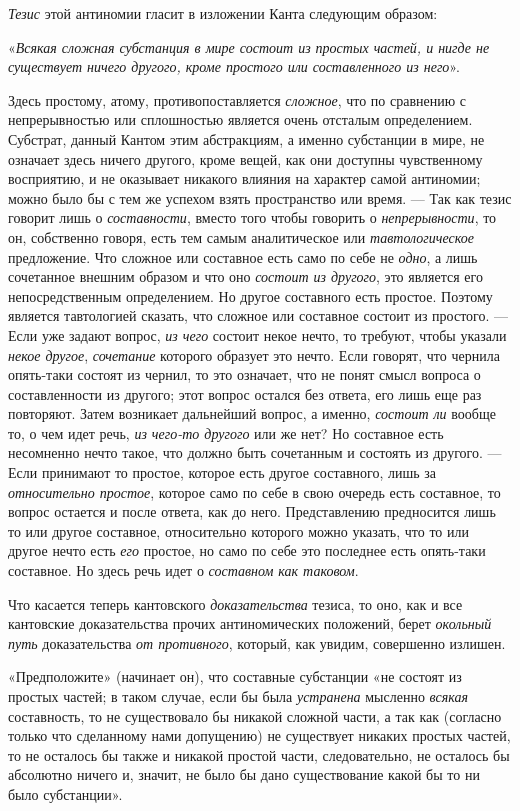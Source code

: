 {\em Тезис} этой антиномии гласит в изложении Канта
следующим образом:

«{\em Всякая сложная субстанция в мире состоит из
простых частей, и нигде не существует ничего другого, кроме простого или
составленного из него}».

Здесь простому, атому, противопоставляется
{\em сложное}, что по сравнению с непрерывностью или
сплошностью является очень отсталым определением. Субстрат, данный Кантом
этим абстракциям, а именно субстанции в мире, не означает здесь ничего
другого, кроме вещей, как они доступны чувственному восприятию, и не
оказывает никакого влияния на характер самой антиномии; можно было бы с тем
же успехом взять пространство или время. — Так как тезис говорит лишь о
{\em составности}, вместо того чтобы говорить о
{\em непрерывности}, то он, собственно говоря, есть тем
самым аналитическое или {\em тавтологическое}
предложение. Что сложное или составное есть само по себе не
{\em одно}, а лишь сочетанное внешним образом и что оно
{\em состоит из другого}, это является его
непосредственным определением. Но другое составного есть простое. Поэтому
является тавтологией сказать, что сложное или составное состоит из
простого. — Если уже задают вопрос, {\em из чего}
состоит некое нечто, то требуют, чтобы указали
{\em некое другое}, {\em сочетание}
которого образует это нечто. Если говорят, что чернила опять-таки состоят
из чернил, то это означает, что не понят смысл вопроса о составленности из
другого; этот вопрос остался без ответа, его лишь еще раз повторяют. Затем
возникает дальнейший вопрос, а именно, {\em состоит ли}
вообще то, о чем идет речь, {\em из чего-то другого}
или же нет? Но составное есть несомненно нечто такое, что должно быть
сочетанным и состоять из другого. — Если принимают то простое, которое есть
другое составного, лишь за {\em относительно простое},
которое само по себе в свою очередь есть составное, то вопрос остается и
после ответа, как до него. Представлению предносится лишь то или другое
составное, относительно которого можно указать, что то или другое нечто
есть {\em его} простое, но само по себе это последнее
есть опять-таки составное. Но здесь речь идет о
{\em составном как таковом}.

Что касается теперь кантовского {\em доказательства}
тезиса, то оно, как и все кантовские доказательства прочих антиномических
положений, берет {\em окольный путь} доказательства
{\em от противного}, который, как увидим, совершенно
излишен.

«Предположите» (начинает он), что составные субстанции «не состоят из
простых частей; в таком случае, если бы была
{\em устранена} мысленно
{\em всякая} составность, то не существовало бы никакой
сложной части, а так как (согласно только что сделанному нами допущению) не
существует никаких простых частей, то не осталось бы также и никакой
простой части, следовательно, не осталось бы абсолютно ничего и, значит, не
было бы дано существование какой бы то ни было субстанции».

